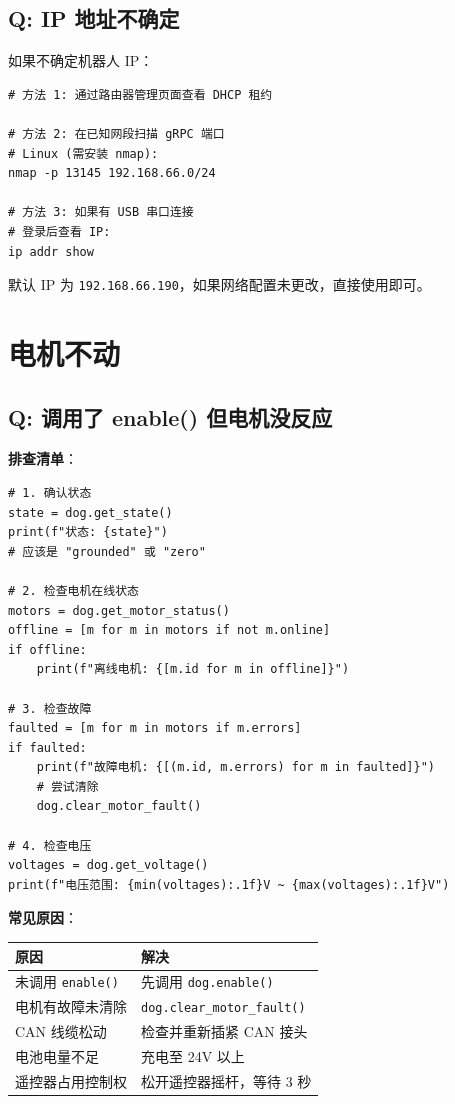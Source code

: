 \documentclass[a4paper,11pt,openany]{book}
\begin{document}
\subsection{Q: IP 地址不确定}

如果不确定机器人 IP：

\begin{lstlisting}[style=bash]
# 方法 1: 通过路由器管理页面查看 DHCP 租约

# 方法 2: 在已知网段扫描 gRPC 端口
# Linux (需安装 nmap):
nmap -p 13145 192.168.66.0/24

# 方法 3: 如果有 USB 串口连接
# 登录后查看 IP:
ip addr show
\end{lstlisting}

默认 IP 为 \texttt{192.168.66.190}，如果网络配置未更改，直接使用即可。

\section{电机不动}

\subsection{Q: 调用了 enable() 但电机没反应}

\noindent\textbf{排查清单}：

\begin{lstlisting}[style=python]
# 1. 确认状态
state = dog.get_state()
print(f"状态: {state}")
# 应该是 "grounded" 或 "zero"

# 2. 检查电机在线状态
motors = dog.get_motor_status()
offline = [m for m in motors if not m.online]
if offline:
    print(f"离线电机: {[m.id for m in offline]}")

# 3. 检查故障
faulted = [m for m in motors if m.errors]
if faulted:
    print(f"故障电机: {[(m.id, m.errors) for m in faulted]}")
    # 尝试清除
    dog.clear_motor_fault()

# 4. 检查电压
voltages = dog.get_voltage()
print(f"电压范围: {min(voltages):.1f}V ~ {max(voltages):.1f}V")
\end{lstlisting}

\noindent\textbf{常见原因}：

\begin{longtable}{ll}
\toprule
原因 & 解决 \\
\midrule
\endhead
未调用 \texttt{enable()} & 先调用 \texttt{dog.enable()} \\
电机有故障未清除 & \texttt{dog.clear\_motor\_fault()} \\
CAN 线缆松动 & 检查并重新插紧 CAN 接头 \\
电池电量不足 & 充电至 24V 以上 \\
遥控器占用控制权 & 松开遥控器摇杆，等待 3 秒 \\
\bottomrule
\end{longtable}
\end{document}
